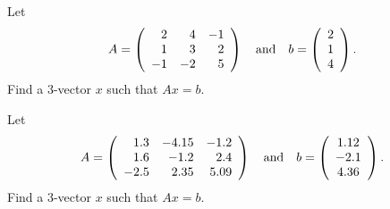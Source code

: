 \begin{exercise} \label{c4.1.10}
Let
\begin{equation*}
A = \left(\begin{array}{rrr} 2 & 4 & -1 \\ 1 & 3 & 2\\
-1 & -2 & 5 \end{array}\right) \quad\mbox{and}\quad
b = \left(\begin{array}{c} 2 \\ 1 \\ 4 \end{array}\right).
\end{equation*}
Find a $3$-vector $x$ such that $Ax=b$.
\end{exercise}

\begin{exercise} \label{c4.1.11}
Let
\begin{equation*}
A = \left(\begin{array}{rrr} 1.3 & -4.15 & -1.2 \\ 1.6 & -1.2 & 2.4\\
-2.5 & 2.35 & 5.09 \end{array}\right) \quad\mbox{and}\quad
b = \left(\begin{array}{c} 1.12 \\ -2.1 \\ 4.36 \end{array}\right).
\end{equation*}
Find a $3$-vector $x$ such that $Ax=b$.
\end{exercise}

